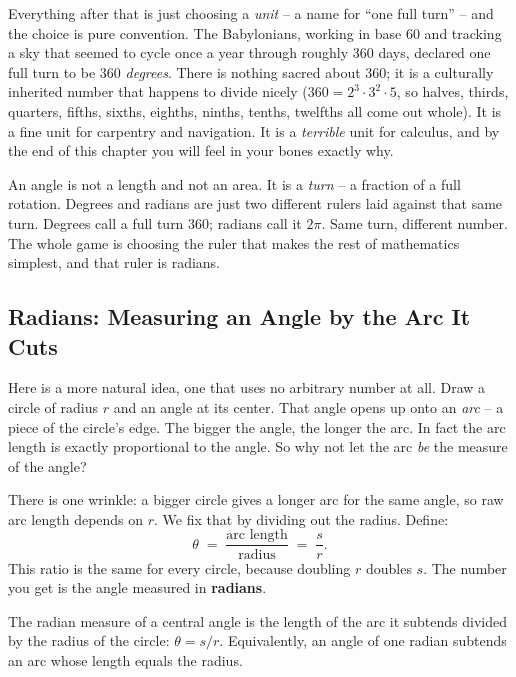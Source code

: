 Everything after that is just choosing a \emph{unit} -- a name for ``one full turn'' -- and the choice is pure convention. The Babylonians, working in base 60 and tracking a sky that seemed to cycle once a year through roughly 360 days, declared one full turn to be $360$ \emph{degrees}. There is nothing sacred about $360$; it is a culturally inherited number that happens to divide nicely ($360 = 2^3\cdot 3^2 \cdot 5$, so halves, thirds, quarters, fifths, sixths, eighths, ninths, tenths, twelfths all come out whole). It is a fine unit for carpentry and navigation. It is a \emph{terrible} unit for calculus, and by the end of this chapter you will feel in your bones exactly why.

\begin{intuitionbox}
An angle is not a length and not an area. It is a \emph{turn} -- a fraction of a full rotation. Degrees and radians are just two different rulers laid against that same turn. Degrees call a full turn $360$; radians call it $2\pi$. Same turn, different number. The whole game is choosing the ruler that makes the rest of mathematics simplest, and that ruler is radians.
\end{intuitionbox}

\subsection{Radians: Measuring an Angle by the Arc It Cuts}

Here is a more natural idea, one that uses no arbitrary number at all. Draw a circle of radius $r$ and an angle at its center. That angle opens up onto an \emph{arc} -- a piece of the circle's edge. The bigger the angle, the longer the arc. In fact the arc length is exactly proportional to the angle. So why not let the arc \emph{be} the measure of the angle?

There is one wrinkle: a bigger circle gives a longer arc for the same angle, so raw arc length depends on $r$. We fix that by dividing out the radius. Define:
\[
  \theta \;=\; \frac{\text{arc length}}{\text{radius}} \;=\; \frac{s}{r}.
\]
This ratio is the same for every circle, because doubling $r$ doubles $s$. The number you get is the angle measured in \textbf{radians}.

\begin{definition}[Radian]
\label{ch04:def-radian}
The radian measure of a central angle is the length of the arc it subtends divided by the radius of the circle: $\theta = s/r$. Equivalently, an angle of one radian subtends an arc whose length equals the radius.
\end{definition}

